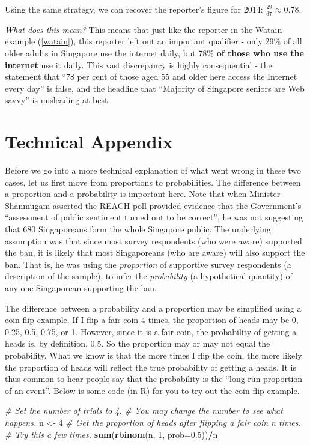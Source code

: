 \documentclass[openany]{book}
\newenvironment{Shaded}{\begin{snugshade}}{\end{snugshade}}
\newcommand{\KeywordTok}[1]{\textcolor[rgb]{0.13,0.29,0.53}{\textbf{#1}}}
\newcommand{\DataTypeTok}[1]{\textcolor[rgb]{0.13,0.29,0.53}{#1}}
\newcommand{\DecValTok}[1]{\textcolor[rgb]{0.00,0.00,0.81}{#1}}
\newcommand{\FloatTok}[1]{\textcolor[rgb]{0.00,0.00,0.81}{#1}}
\newcommand{\StringTok}[1]{\textcolor[rgb]{0.31,0.60,0.02}{#1}}
\newcommand{\CommentTok}[1]{\textcolor[rgb]{0.56,0.35,0.01}{\textit{#1}}}
\newcommand{\OperatorTok}[1]{\textcolor[rgb]{0.81,0.36,0.00}{\textbf{#1}}}
\newcommand{\NormalTok}[1]{#1}
\begin{document}
Using the same strategy, we can recover the reporter's figure for 2014:
\(\frac{29}{37} \approx 0.78\).

\emph{What does this mean?} This means that just like the reporter in
the Watain example (\ref{watain}), this reporter left out an important
qualifier - only 29\% of all older adults in Singapore use the internet
daily, but 78\% \textbf{of those who use the internet} use it daily.
This vast discrepancy is highly consequential - the statement that ``78
per cent of those aged 55 and older here access the Internet every day''
is false, and the headline that ``Majority of Singapore seniors are Web
savvy'' is misleading at best.

\section{Technical Appendix}\label{ooptech}

Before we go into a more technical explanation of what went wrong in
these two cases, let us first move from proportions to probabilities.
The difference between a proportion and a probability is important here.
Note that when Minister Shanmugam asserted the REACH poll provided
evidence that the Government's ``assessment of public sentiment turned
out to be correct'', he was not suggesting that 680 Singaporeans form
the whole Singapore public. The underlying assumption was that since
most survey respondents (who were aware) supported the ban, it is likely
that most Singaporeans (who are aware) will also support the ban. That
is, he was using the \emph{proportion} of supportive survey respondents
(a description of the sample), to infer the \emph{probability} (a
hypothetical quantity) of any one Singaporean supporting the ban.

The difference between a probability and a proportion may be simplified
using a coin flip example. If I flip a fair coin 4 times, the proportion
of heads may be 0, 0.25, 0.5, 0.75, or 1. However, since it is a fair
coin, the probability of getting a heads is, by definition, 0.5. So the
proportion may or may not equal the probability. What we know is that
the more times I flip the coin, the more likely the proportion of heads
will reflect the true probability of getting a heads. It is thus common
to hear people say that the probability is the ``long-run proportion of
an event''. Below is some code (in R) for you to try out the coin flip
example.

\begin{Shaded}
\begin{Highlighting}[]
\CommentTok{# Set the number of trials to 4. }
\CommentTok{# You may change the number to see what happens.}
\NormalTok{n <-}\StringTok{ }\DecValTok{4} 
\CommentTok{# Get the proportion of heads after flipping a fair coin n times. }
\CommentTok{# Try this a few times.}
\KeywordTok{sum}\NormalTok{(}\KeywordTok{rbinom}\NormalTok{(n, }\DecValTok{1}\NormalTok{, }\DataTypeTok{prob=}\FloatTok{0.5}\NormalTok{))}\OperatorTok{/}\NormalTok{n }
\end{Highlighting}
\end{Shaded}
\end{document}
